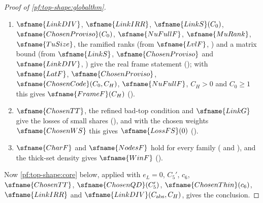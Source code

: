 \begin{proof}[Proof of \cref{pf:top-shape:globalthm}]
\begin{enumerate}[label=(\arabic*)]
(), proved with a Mertens-type estimate for
$\tau$-sums, and hence $\sfname{SlopesNF}$ ().
\item $\sfname{LinkDIV}$, $\sfname{LinkIRR}$, $\sfname{LinkS}(C_0)$, $\sfname{ChosenProviso}(C_0)$, $\sfname{NuFullF}$,
$\sfname{MuRank}$, $\sfname{TuSize}$, the ramified ranks (from $\sfname{LvlF}$,
) and a matrix bound (from $\sfname{LinkS}$, $\sfname{ChosenProviso}$
and $\sfname{LinkDIV}$, ) give the real frame statement
(); with $\sfname{LatF}$, $\sfname{ChosenProviso}$,
$\sfname{ChosenCode}(C_0,C_H)$, $\sfname{NuFullF}$, $C_H>0$ and $C_0\ge1$ this gives $\sfname{FrameF}(C_H)$
().
\item $\sfname{ChosenTT}$, the refined bad-top condition and $\sfname{LinkG}$ give the losses of small shares
(), and with the chosen weights $\sfname{ChosenWS}$ this gives
$\sfname{LossFS}(0)$ ().
\item $\sfname{CharF}$ and $\sfname{NodesF}$ hold for every family
( and ), and the thick-set density gives
$\sfname{WinF}$ ().
\end{enumerate}
Now \cref{pf:top-shape:core} below, applied with $e_L=0$, $C_5'$, $c_6$, $\sfname{ChosenTT}$, $\sfname{ChosenQD}(C_5')$,
$\sfname{ChosenThin}(c_6)$, $\sfname{LinkIRR}$ and $\sfname{LinkDIV}(C_{\rm abs},C_H)$, gives the conclusion.
\end{proof}

